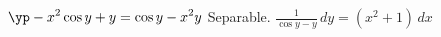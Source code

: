 {
$\displaystyle \yp  -x^2\cos y + y = \cos y - x^2 y$
}
{
Separable. $\displaystyle \frac{1}{\cos y - y}\,dy = (x^2+1)\,dx$
}
